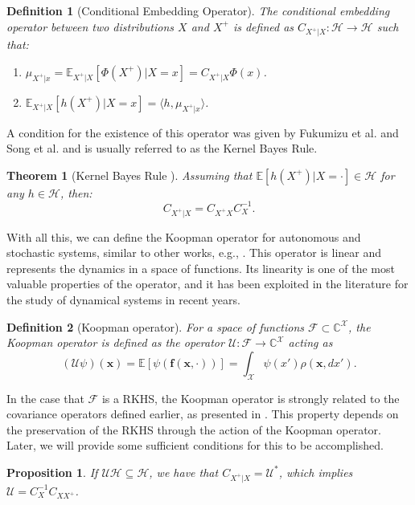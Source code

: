 \documentclass{article}
\newcommand{\E}{\mathbb{E}} %
\newtheorem{defn}{Definition}
\newtheorem{theo}{Theorem}
\newtheorem{prop}{Proposition}
\renewcommand{\H}{\mathcal{H}}
\newcommand{\U}{\mathcal{U}}
\newcommand{\X}{\mathcal{X}}
\begin{document}
\begin{defn}[Conditional Embedding Operator]
    The conditional embedding operator between two distributions $X$ and $X^+$ is defined as $C_{X^+|X} : \H \to \H$ such that:
    \begin{enumerate}
        \item $\mu_{X^+|x} = \mathbb{E}_{X^+|X}[\Phi(X^+)|X=x] = C_{X^+|X}\Phi (x)$.
        \item $\mathbb{E}_{X^+|X}[h(X^+)|X=x] = \langle h, \mu_{X^+|x} \rangle$.
    \end{enumerate}
\end{defn}
A condition for the existence of this operator was given by Fukumizu et al. and Song et al. and is usually referred to as the Kernel Bayes Rule.

\begin{theo}[Kernel Bayes Rule \cite{Fukumizu2004DimensionalitySpaces, Song2009HilbertSystems}]
    Assuming that $ \mathbb{E}[h(X^+)|X = \cdot] \in \H $ for any $ h \in \H $, then:
    \[ C_{X^+|X} = C_{X^+X} C_{X}^{-1}.\]
\end{theo}
With all this, we can define the Koopman operator for autonomous and stochastic systems, similar to other works, e.g., \cite{Philipp2023ErrorFramework}. This operator is linear and represents the dynamics in a space of functions. Its linearity is one of the most valuable properties of the operator, and it has been exploited in the literature for the study of dynamical systems in recent years.

\begin{defn}[Koopman operator]
For a space of functions $\mathcal{F} \subset \mathbb{C}^\X$, the Koopman operator is defined as the operator \(\U : \mathcal{F} \to \mathbb{C}^\X \) acting as
\[
(\U \psi)(\mathbf{x}) = \E[\psi(\mathbf{f}(\mathbf{x},\cdot))] = \int_\X \psi(x') \rho (\mathbf{x}, dx').
\]
\end{defn}

In the case that $\mathcal{F}$ is a RKHS, the Koopman operator is strongly related to the covariance operators defined earlier, as presented in \cite{Philipp2024ErrorOperator}. This property depends on the preservation of the RKHS through the action of the Koopman operator. Later, we will provide some sufficient conditions for this to be accomplished.

\begin{prop} \label{prop:covariance_koopman}
    If $\U\H \subseteq \H$, we have that $C_{X^+|X} = \U^*$, which implies \(\U = C_X^{-1} C_{XX^+}\).
\end{prop}
\end{document}
